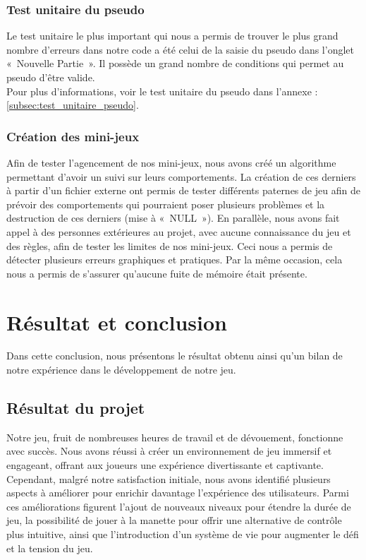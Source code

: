 \documentclass[12pt,a4paper]{article}
\begin{document}
            \subsubsection{Test unitaire du pseudo}
                \tabto{1cm} Le test unitaire le plus important qui nous a permis de trouver le plus grand nombre d'erreurs dans notre code a été celui de la saisie du pseudo dans l'onglet «~Nouvelle Partie~». Il possède un grand nombre de conditions qui permet au pseudo d'être valide.\\
                Pour plus d'informations, voir le test unitaire du pseudo dans l'annexe : \ref{subsec:test_unitaire_pseudo}.
                
            \subsubsection{Création des mini-jeux}
                \tabto{1cm} Afin de tester l’agencement de nos mini-jeux, nous avons créé un algorithme permettant d’avoir un suivi sur leurs comportements. La création de ces derniers à partir d’un fichier externe ont permis de tester différents paternes de jeu afin de prévoir des comportements qui pourraient poser plusieurs problèmes et la destruction de ces derniers (mise à «~NULL~»). En parallèle, nous avons fait appel à des personnes extérieures au projet, avec aucune connaissance du jeu et des règles, afin de tester les limites de nos mini-jeux. Ceci nous a permis de détecter plusieurs erreurs graphiques et pratiques. Par la même occasion, cela nous a permis de s’assurer qu’aucune fuite de mémoire était présente.
            
    \newpage

    \section{Résultat et conclusion}
        \tabto{1cm} Dans cette conclusion, nous présentons le résultat obtenu ainsi qu'un bilan de notre expérience dans le développement de notre jeu.\\

        \subsection{Résultat du projet}
            \tabto{1cm} Notre jeu, fruit de nombreuses heures de travail et de dévouement, fonctionne avec succès. Nous avons réussi à créer un environnement de jeu immersif et engageant, offrant aux joueurs une expérience divertissante et captivante. Cependant, malgré notre satisfaction initiale, nous avons identifié plusieurs aspects à améliorer pour enrichir davantage l'expérience des utilisateurs. Parmi ces améliorations figurent l'ajout de nouveaux niveaux pour étendre la durée de jeu, la possibilité de jouer à la manette pour offrir une alternative de contrôle plus intuitive, ainsi que l'introduction d'un système de vie pour augmenter le défi et la tension du jeu.\\
            
\end{document}
